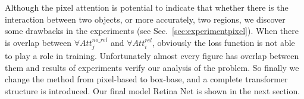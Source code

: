 Although the pixel attention is potential to indicate that whether there is the interaction between two objects, or more accurately, two regions, we discover some drawbacks in the experiments (see Sec.~\ref{sec:experimentpixel}). When there is overlap between $ \forall Att_j^{no\_rel}  $ and $ \forall Att_i^{rel} $, obviously the loss function is not able to play a role in training. Unfortunately  almost every figure has overlap between them and results of experiments verify our analysis of the problem.
So finally we change the method from pixel-based to box-base, and a complete transformer structure is introduced. Our final model Retina Net is shown in the next section.
%
%
%
%
%
%
%
